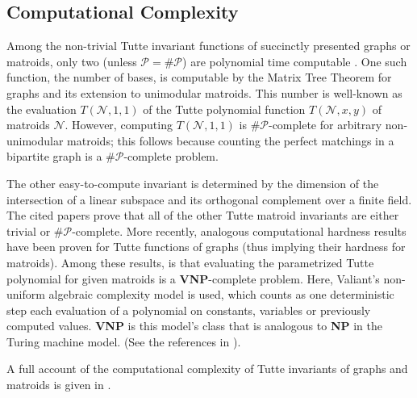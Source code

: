 \documentclass[12pt]{article}
\theoremstyle{definition}
\begin{document}
\subsection{Computational Complexity}
\label{Complexity}

Among the non-trivial Tutte
invariant functions of 
succinctly presented graphs or matroids,
only two (unless $\mathcal{P}=\mathcal{\#P}$)
are polynomial time 
computable
\cite{JaegerVertiganWelsh,MR99k:05053}.
One such function,
the number of bases,
is computable by the Matrix Tree Theorem
for graphs and its extension 
to unimodular matroids.  
This number 
is well-known as the evaluation $T(\mathcal{N},1,1)$ of the 
Tutte polynomial
function $T(\mathcal{N},x,y)$ of matroids $\mathcal{N}$.
However, 
computing $T(\mathcal{N},1,1)$ 
is $\#\mathcal{P}$-complete 
for arbitrary non-unimodular matroids\cite{VertiganBaseCounting}; this follows
because counting the perfect matchings in a bipartite graph is 
a $\#\mathcal{P}$-complete problem\cite{ValiantNumPComplete}.

The other easy-to-compute invariant is
determined by the 
dimension of the intersection of a linear subspace and its orthogonal
complement over a finite field\cite{MR99k:05053}.
The cited papers prove
that all of the other Tutte
matroid invariants are
either trivial or $\#\mathcal{P}$-complete.
More recently, analogous computational hardness results have been
proven for
Tutte functions of graphs (thus implying 
their hardness for matroids).
Among these results, 
is that  evaluating
the parametrized Tutte polynomial for given matroids
is a \textbf{VNP}-complete problem\cite{MakowskyLotzComplexity}.
Here, Valiant's non-uniform algebraic complexity model\cite{ValiantNonUnif}
is used, which 
counts as one 
deterministic
step each evaluation of a
polynomial on
constants, variables or previously
computed values.
\textbf{VNP} is this model's class that is analogous to 
\textbf{NP} in the Turing machine model.
(See the references in \cite{MakowskyLotzComplexity}).

A full account of 
the computational 
complexity
of Tutte
invariants of graphs and matroids is given in
\cite{JaegerVertiganWelsh,MR94m:57027,MR99k:05053,OxleyWelshTuttePolyPolyTime,
WelshRandomApprox,WelshApproxCounting}.
\end{document}
